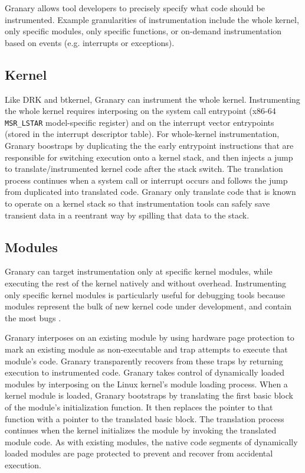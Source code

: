 \documentclass[preprint]{sigplanconf}
\begin{document}
Granary allows tool developers to precisely specify what code should be instrumented. Example granularities of instrumentation include the whole kernel, only specific modules, only specific functions, or on-demand instrumentation based on events (e.g. interrupts or exceptions).

\subsection{Kernel}
Like DRK and btkernel, Granary can instrument the whole kernel. Instrumenting the whole kernel requires interposing on the system call entrypoint (x86-64 \texttt{MSR\_LSTAR} model-specific register) and on the interrupt vector entrypoints (stored in the interrupt descriptor table). For whole-kernel instrumentation, Granary boostraps by duplicating the the early entrypoint instructions that are responsible for switching execution onto a kernel stack, and then injects a jump to translate/instrumented kernel code after the stack switch. The translation process continues when a system call or interrupt occurs and follows the jump from duplicated into translated code. Granary only translate code that is known to operate on a kernel stack so that instrumentation tools can safely save transient data in a reentrant way by spilling that data to the stack.

\subsection{Modules}\label{sec:module}

Granary can target instrumentation only at specific kernel modules, while executing the rest of the kernel natively and without overhead. Instrumenting only specific kernel modules is particularly useful for debugging tools because modules represent the bulk of new kernel code under development, and contain the most bugs \cite{FaultsInLinux}.

Granary interposes on an existing module by using hardware page protection to mark an existing module as non-executable and trap attempts to execute that module's code. Granary transparently recovers from these traps by returning execution to instrumented code. Granary takes control of dynamically loaded modules by interposing on the Linux kernel's module loading process. When a kernel module is loaded, Granary bootstraps by translating the first basic block of the module's initialization function.  It then replaces the pointer to that function with a pointer to the translated basic block. The translation process continues when the kernel initializes the module by invoking the translated module code. As with existing modules, the native code segments of dynamically loaded modules are page protected to prevent and recover from accidental execution. 
\end{document}
